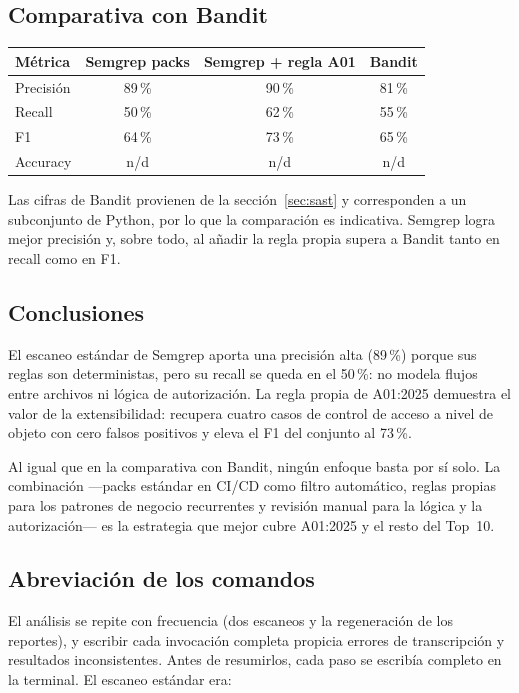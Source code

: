 \documentclass[11pt,letterpaper]{article}
\newcommand{\enc}[1]{\textbf{#1}}
\begin{document}
\subsection{Comparativa con Bandit}

\begin{center}
\begin{tabular}{lccc}
\toprule
\enc{Métrica} & \enc{Semgrep packs} & \enc{Semgrep + regla A01} & \enc{Bandit} \\
\midrule
Precisión & 89\,\% & 90\,\% & 81\,\% \\
Recall & 50\,\% & 62\,\% & 55\,\% \\
F1 & 64\,\% & 73\,\% & 65\,\% \\
Accuracy & n/d & n/d & n/d \\
\bottomrule
\end{tabular}
\end{center}

Las cifras de Bandit provienen de la sección~\ref{sec:sast} y corresponden a un subconjunto de Python, por lo que la comparación es indicativa. Semgrep logra mejor precisión y, sobre todo, al añadir la regla propia supera a Bandit tanto en recall como en F1.

\subsection{Conclusiones}

El escaneo estándar de Semgrep aporta una precisión alta (89\,\%) porque sus reglas son deterministas, pero su recall se queda en el 50\,\%: no modela flujos entre archivos ni lógica de autorización. La regla propia de A01:2025 demuestra el valor de la extensibilidad: recupera cuatro casos de control de acceso a nivel de objeto con cero falsos positivos y eleva el F1 del conjunto al 73\,\%.

Al igual que en la comparativa con Bandit, ningún enfoque basta por sí solo. La combinación —packs estándar en CI/CD como filtro automático, reglas propias para los patrones de negocio recurrentes y revisión manual para la lógica y la autorización— es la estrategia que mejor cubre A01:2025 y el resto del Top~10.

\subsection{Abreviación de los comandos}

El análisis se repite con frecuencia (dos escaneos y la regeneración de los reportes), y escribir cada invocación completa propicia errores de transcripción y resultados inconsistentes. Antes de resumirlos, cada paso se escribía completo en la terminal. El escaneo estándar era:
\end{document}
